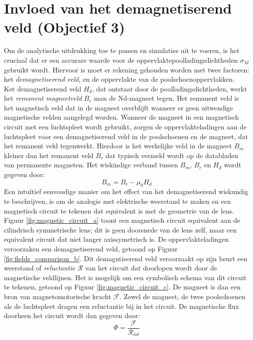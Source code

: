 \documentclass[we,twoside,openright,a4paper,11pt]{uantwerpenbamathesis}
\begin{document}
\section{Invloed van het demagnetiserend veld (Objectief 3)}\label{ch:reluctantie}
Om de analytische uitdrukking toe te passen en simulaties uit te voeren, is het cruciaal dat er een accurare waarde voor de oppervlaktepoolladingsdichtheden $\sigma_M$ gebruikt wordt. Hiervoor is moet er rekening gehouden worden met twee factoren: het \textit{demagnetiserend veld}, en de oppervlakte van de poolschoenoppervlakken.\\

Ket demagnetiserend veld $H_d$, dat ontstaat door de poolladingsdichtheden, werkt het \textit{remanent magneetveld} $B_r$ man de Nd-magneet tegen. Het remanent veld is het magnetisch veld dat in de magneet overblijft wanneer er geen uitwendige magnetische velden aangelegd worden. Wanneer de magneet in een magnetisch circuit met een luchtspleet wordt gebruikt, zorgen de oppervlakteladingen aan de luchtspleet voor een demagnetiserend veld in de poolschoenen en de magneet, dat het remanent veld tegenwerkt. Hierdoor is het werkelijke veld in de magneet $B_m$ kleiner dan het remanent veld $B_r$ dat typisch vermeld wordt op de databladen van permanente magneten. Het wiskindige verband tussen $B_m$, $B_r$ en $H_d$ wordt gegeven door:
\begin{equation}
    B_m=B_r-\mu_0H_d
\end{equation}
Een intuïtief eenvoudige manier om het effect van het demagnetiserend wiskundig te beschrijven, is om de analogie met elektrische weerstand te maken en een magnetisch circuit te tekenen dat equivalent is met de geometrie van de lens. Figuur \ref{fig:magnetic_circuit_a} toont een magnetisch circuit equivalent aan de cilindrisch symmetrische lens; dit is geen doorsnede van de lens zelf, maar een equivalent circuit dat niet langer axissymetrisch is. De oppervlakteladingen veroorzaken een demagnetiserend veld, getoond op Figuur \ref{fig:fields_comparison_b}. Dit demagntiserend veld veroorzaakt op zijn beurt een weerstand of \textit{reluctantie} $\mathcal{R}$ van het circuit dat doorlopen wordt door de magnetische veldlijnen. Het is mogelijk om een symbolisch schema van dit circuit te tekenen, getoond op Figuur \ref{fig:magnetic_circuit_c}. De magneet is dan een bron van magnetomotorische kracht $\mathcal{F}$. Zowel de magneet, de twee poolschoenen als de luchtspleet dragen een reluctantie bij in het circuit. De magnetische flux doorheen het circuit wordt dan gegeven door:
\begin{equation}\label{eq:flux_mmf_reluctance}
    \Phi = \frac{\mathcal{F}}{\mathcal{R}_{tot}}
\end{equation}
\end{document}
